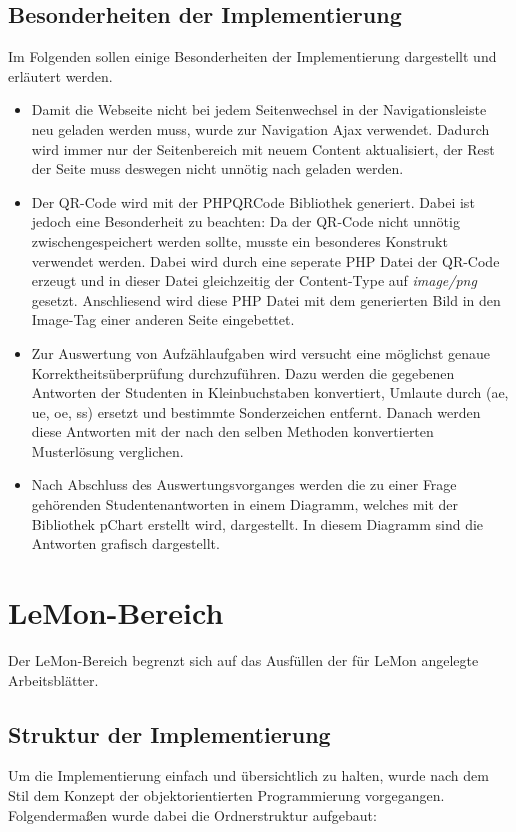 \subsection{Besonderheiten der Implementierung}
Im Folgenden sollen einige Besonderheiten der Implementierung dargestellt und
erläutert werden.
\begin{singlespacing}
	\begin{itemize}
		\item Damit die Webseite nicht bei jedem Seitenwechsel in der Navigationsleiste
			neu geladen werden muss, wurde zur Navigation Ajax verwendet. Dadurch wird immer
			nur der Seitenbereich mit neuem Content aktualisiert, der Rest der Seite muss
			deswegen nicht unnötig nach geladen werden.
		\item Der QR-Code wird mit der \gls{PHPQRCode} Bibliothek generiert. Dabei ist
			jedoch eine Besonderheit zu beachten: Da der QR-Code nicht unnötig
			zwischengespeichert werden sollte, musste ein besonderes Konstrukt verwendet
			werden. Dabei wird durch eine seperate \gls{PHP} Datei der QR-Code erzeugt und in
			dieser Datei gleichzeitig der Content-Type auf \emph{image/png} gesetzt.
			Anschliesend wird diese \gls{PHP} Datei mit dem generierten Bild in den Image-Tag
			einer anderen Seite eingebettet.
		\item Zur Auswertung von Aufzählaufgaben wird versucht eine möglichst genaue
			Korrektheitsüberprüfung durchzuführen. Dazu werden die gegebenen Antworten der
			Studenten in Kleinbuchstaben konvertiert, Umlaute durch (ae, ue, oe, ss) ersetzt
			und bestimmte Sonderzeichen entfernt. Danach werden diese Antworten mit der nach
			den selben Methoden konvertierten Musterlösung verglichen.
		\item Nach Abschluss des Auswertungsvorganges werden die zu einer Frage
			gehörenden Studentenantworten in einem Diagramm, welches mit der Bibliothek
			\gls{pChart} erstellt wird, dargestellt. In diesem Diagramm sind die Antworten
			grafisch dargestellt.
	\end{itemize}
\end{singlespacing}



\section{LeMon-Bereich}
Der \gls{LeMon}-Bereich begrenzt sich auf das Ausfüllen der für \gls{LeMon} angelegte Arbeitsblätter.
\subsection{Struktur der Implementierung}
Um die Implementierung einfach und übersichtlich zu halten, wurde nach dem Stil
dem Konzept der objektorientierten Programmierung vorgegangen.\\
Folgendermaßen wurde dabei die Ordnerstruktur aufgebaut:

